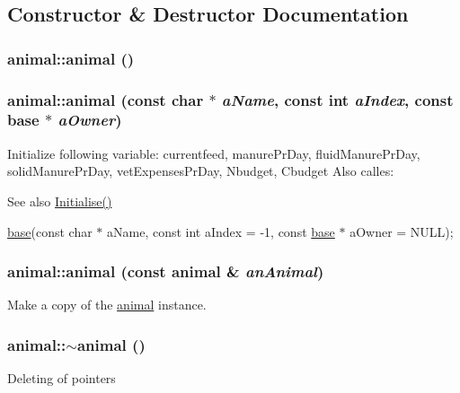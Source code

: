 \subsection{Constructor \& Destructor Documentation}
\hypertarget{classanimal_a1fd2e1162143bd494f2629975c01b96a}{
\subsubsection[{animal}]{\setlength{\rightskip}{0pt plus 5cm}animal::animal ()}}
\label{classanimal_a1fd2e1162143bd494f2629975c01b96a}
\hypertarget{classanimal_a01eae0aa68a191b48c488814fbec49ad}{
\subsubsection[{animal}]{\setlength{\rightskip}{0pt plus 5cm}animal::animal (const char $\ast$ {\em aName}, \/  const int {\em aIndex}, \/  const {\bf base} $\ast$ {\em aOwner})}}
\label{classanimal_a01eae0aa68a191b48c488814fbec49ad}
Initialize following variable: currentfeed, manurePrDay, fluidManurePrDay, solidManurePrDay, vetExpensesPrDay, Nbudget, Cbudget Also calles: \begin{DoxySeeAlso}{See also}
\hyperlink{classanimal_a06e14e53c94c2184ec43993b78b8d74b}{Initialise()} 

\hyperlink{classbase}{base}(const char $\ast$ aName, const int aIndex = -\/1, const \hyperlink{classbase}{base} $\ast$ aOwner = NULL); 
\end{DoxySeeAlso}
\hypertarget{classanimal_ac9bcedb7d063e6917acb53242e65750a}{
\subsubsection[{animal}]{\setlength{\rightskip}{0pt plus 5cm}animal::animal (const {\bf animal} \& {\em anAnimal})}}
\label{classanimal_ac9bcedb7d063e6917acb53242e65750a}
Make a copy of the \hyperlink{classanimal}{animal} instance. \hypertarget{classanimal_a4bee7f96358304ed6500f5cc2064dcc9}{
\subsubsection[{$\sim$animal}]{\setlength{\rightskip}{0pt plus 5cm}animal::$\sim$animal ()}}
\label{classanimal_a4bee7f96358304ed6500f5cc2064dcc9}
Deleting of pointers 


